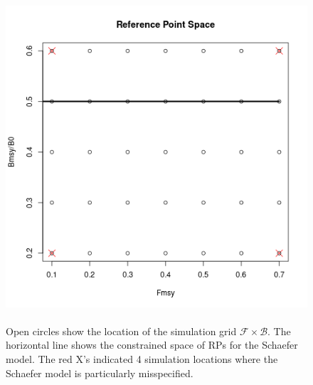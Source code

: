 \documentclass[12pt]{article}
\begin{document}
{%
$~$\\
\begin{figure}[h!]
\hspace*{0.5cm}
\begin{minipage}[h!]{0.6\textwidth}
\includegraphics[width=\textwidth]{../present/shaeferDat.png}
\end{minipage}
\begin{minipage}[h!]{0.3\textwidth}
\caption{\label{rpGrid}\\
Open circles show the \mbox{location} of the simulation grid \mbox{$\mathcal{F}\times\mathcal{B}$.}
The \mbox{horizontal} line shows the \mbox{constrained} space of RPs for the \mbox{Schaefer} model.
The red X's indicated 4 simulation locations where the \mbox{Schaefer} model is particularly 
misspecified.
}
\end{minipage}
\end{figure}

}
\end{document}

